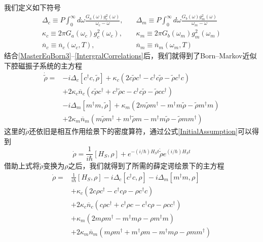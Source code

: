 我们定义如下符号
\begin{align}
\Delta_c \equiv P \int_{0}^{\infty} d \omega \frac{G_a(\omega) g_{c}^{2}(\omega)}{\omega_{c}-\omega},
&\quad \Delta_m \equiv P \int_{0}^{\infty} d \omega \frac{G_b(\omega) g_{m}^{2}(\omega)}{\omega_{m}-\omega} \\
\kappa_c \equiv 2 \pi G_a\left(\omega_{c}\right)g_{c}^{2}(\omega_c),
&\quad \kappa_m \equiv 2 \pi G_b\left(\omega_{m}\right)g_{m}^{2}(\omega_m) \\
\overline{n}_c \equiv \overline{n}_c\left(\omega_{c}, T\right),\label{KcKmDefination}
&\quad \overline{n}_m \equiv \overline{n}_m\left(\omega_{m}, T\right)
\end{align}
结合\eqref{MasterEqBorn3}--\eqref{IntergralCorrelations}后，我们就得到了Born--Markov近似下腔磁振子系统的主方程
\begin{equation}
\begin{aligned}
\dot{\tilde{\rho}}={}&-i \Delta_c\left[c^{\dagger} c, \tilde{\rho}\right]+\kappa_c\left(2 c \tilde{\rho} c^{\dagger}-c^{\dagger} c \tilde{\rho}-\tilde{\rho} c^{\dagger} c\right) \\
&+2 \kappa_c \overline{n}_c\left(c \tilde{\rho} c^{\dagger}+c^{\dagger} \tilde{\rho} c-c^{\dagger} c \tilde{\rho}-\tilde{\rho} c c^{\dagger}\right) \\
&-i \Delta_m\left[m^{\dagger} m, \tilde{\rho}\right]+\kappa_m\left(2 m \tilde{\rho} m^{\dagger}-m^{\dagger} m \tilde{\rho}-\tilde{\rho} m^{\dagger} m\right) \\
&+2 \kappa_m \overline{n}_m\left(m \tilde{\rho} m^{\dagger}+m^{\dagger} \tilde{\rho} m-m^{\dagger} m \tilde{\rho}-\tilde{\rho} m m^{\dagger}\right)
\end{aligned}
\end{equation}
这里的$\tilde{\rho}$还依旧是相互作用绘景下的密度算符，通过公式\eqref{InitialAssumption}可以得到
\begin{equation}
\dot{\rho}=\frac{1}{i \hbar}\left[H_{S}, \rho\right]+e^{-(i / \hbar) H_{S} t} \dot{\tilde{\rho}} e^{(i / \hbar) H_{S} t}
\end{equation}
借助上式将$\tilde{\rho}$变换为$\rho$之后，我们就得到了所需的薛定谔绘景下的主方程
\begin{equation}
\begin{aligned}
\dot{\rho}={}&\frac{1}{i \hbar}\left[H_{S}, \rho\right]-i \Delta_c\left[c^{\dagger} c, \rho\right]-i \Delta_m\left[m^{\dagger} m, \rho\right] \\
&+\kappa_c\left(2 c \rho c^{\dagger}-c^{\dagger} c \rho-\rho c^{\dagger} c\right) \\
&+2 \kappa_c \overline{n}_c\left(c \rho c^{\dagger}+c^{\dagger} \rho c-c^{\dagger} c \rho-\rho c c^{\dagger}\right) \\
&+\kappa_m\left(2 m \rho m^{\dagger}-m^{\dagger} m \rho-\rho m^{\dagger} m\right) \\
&+2 \kappa_m \overline{n}_m\left(m \rho m^{\dagger}+m^{\dagger} \rho m-m^{\dagger} m \rho-\rho m m^{\dagger}\right)
\end{aligned}
\end{equation}
